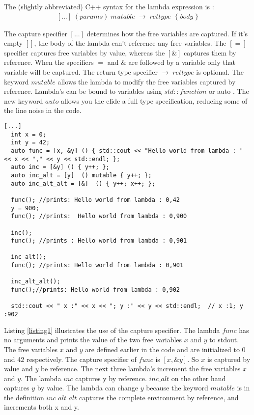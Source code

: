 \documentclass[12pt,fleqn]{article}
\begin{document}
The (slightly abbreviated) C++ syntax for the lambda expression is \cite{lambdaref}:
\[
\begin{array}{rll}
[...] \;  (params) \; mutable \;  \rightarrow \; rettype \;\; \{ \; body \;\}
\end{array}
\]

The capture specifier $[...]$ determines how the free variables are captured.
If it's empty $[]$, the body of the lambda can't reference any free variables.
The $[=]$ specifier captures free variables by value, whereas the $[\&]$ captures them by reference.
When the specifiers $=$ and $\&$ are followed by a variable only that variable will be captured. 
The return type specifier $\rightarrow \; rettype$ is optional.
The keyword $mutable$ allows the lambda to modify the free variables captured by reference. 
Lambda's can be bound to variables using $std::function$ \cite{std::function} or auto \cite{auto}.
The new keyword $auto$ allows you the elide a full type specification, reducing some of the line noise in the code.
%
\begin{lstlisting}[caption=various ways lambda's capture the environment , label=listing1]
[...]
  int x = 0;
  int y = 42;
  auto func = [x, &y] () { std::cout << "Hello world from lambda : " << x << "," << y << std::endl; };
  auto inc = [&y] () { y++; };
  auto inc_alt = [y]  () mutable { y++; };
  auto inc_alt_alt = [&]  () { y++; x++; };

  func(); //prints: Hello world from lambda : 0,42
  y = 900;
  func(); //prints:  Hello world from lambda : 0,900

  inc();
  func(); //prints : Hello world from lambda : 0,901

  inc_alt();
  func(); //prints: Hello world from lambda : 0,901

  inc_alt_alt(); 
  func();//prints: Hello world from lambda : 0,902

  std::cout << " x :" << x << "; y :" << y << std::endl;  // x :1; y :902

\end{lstlisting}
Listing \ref{listing1} illustrates the use of the capture specifier.
The lambda $func$ has no arguments and prints the value of the two free variables $x$ and $y$ to stdout. 
The free variables $x$ and $y$ are defined earlier in the code and are initialized to 0 and 42 respectively. 
The capture specifier of $func$ is $[x,\&y]$.  
So $x$ is captured by value and $y$ be reference.
The next three lambda's increment the free variables $x$ and $y$.
The lambda $inc$ captures y by reference.
$inc\_alt$ on the other hand captures $y$ by value. 
The lambda can change $y$ because the keyword $mutable$ is in the definition  
$inc\_alt\_alt$ captures the complete environment by reference, and increments both x and y.
\end{document}
